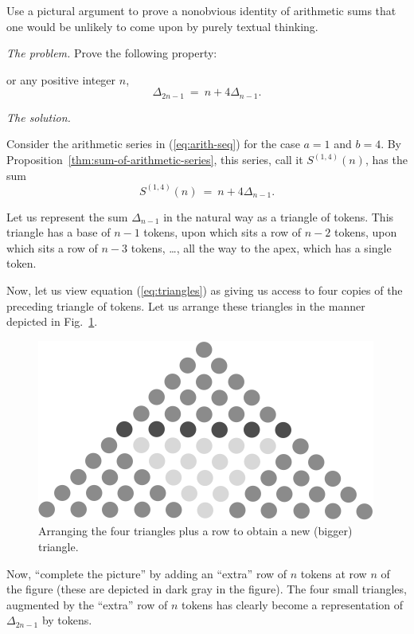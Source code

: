Use a pictural argument to prove a nonobvious identity of arithmetic sums
that one would be unlikely to come upon by purely textual thinking.
\medskip

\noindent \textit{The problem.}
Prove the following property:

or any positive integer $n$,
\[ \Delta_{2n-1} \ = \ n + 4 \Delta_{n-1}. \]
\medskip

\noindent \textit{The solution.}

Consider the arithmetic series in (\ref{eq:arith-seq}) for the case
$a=1$ and $b=4$.  
By Proposition~\ref{thm:sum-of-arithmetic-series},
this series, call it $S^{(1,4)}(n)$, has the sum
\begin{equation}
\label{eq:triangles}
S^{(1,4)}(n) \ = \ n + 4 \Delta_{n-1}.
\end{equation}

Let us represent the sum $\Delta_{n-1}$ in the natural way as a
triangle of tokens.  This triangle has a base of $n-1$ tokens, upon
which sits a row of $n-2$ tokens, upon which sits a row of $n-3$
tokens, \ldots, all the way to the apex, which has a single token.

Now, let us view equation (\ref{eq:triangles}) as giving us access to four
copies of the preceding triangle of tokens.  Let us arrange these
triangles in the manner depicted in Fig.~\ref{fig:Delta(n)4}.
\begin{figure}[ht]
\begin{center}
       \includegraphics[scale=0.5]{FiguresMaths/Delta4}
 \caption{Arranging the four triangles plus a row to obtain a new (bigger) triangle.}
       \label{fig:Delta(n)4}
\end{center}
\end{figure}
Now, ``complete the picture'' by adding an ``extra'' row of $n$
tokens at row $n$ of the figure (these are depicted in dark gray in
the figure).  The four small triangles, augmented by the ``extra'' row
of $n$ tokens has clearly become a representation  of $\Delta_{2n-1}$
by tokens.

